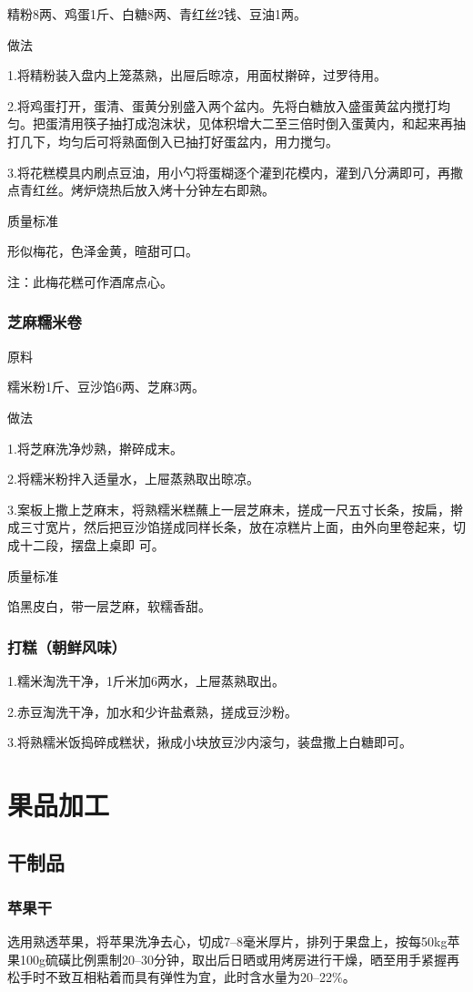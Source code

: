 \documentclass{ctexbook}
\begin{document}
精粉8两、鸡蛋1斤、白糖8两、青红丝2钱、豆油1两。

做法

1.将精粉装入盘内上笼蒸熟，出屉后晾凉，用面杖擀碎，过罗待用。

2.将鸡蛋打开，蛋清、蛋黄分别盛入两个盆内。先将白糖放入盛蛋黄盆内搅打均匀。把蛋清用筷子抽打成泡沫状，见体积增大二至三倍时倒入蛋黄内，和起来再抽打几下，均匀后可将熟面倒入已抽打好蛋盆内，用力搅匀。

3.将花糕模具内刷点豆油，用小勺将蛋糊逐个灌到花模内，灌到八分满即可，再撒点青红丝。烤炉烧热后放入烤十分钟左右即熟。

质量标准

形似梅花，色泽金黄，暄甜可口。

注：此梅花糕可作酒席点心。
\subsection{芝麻糯米卷}
原料

糯米粉1斤、豆沙馅6两、芝麻3两。

做法

1.将芝麻洗净炒熟，擀碎成末。

2.将糯米粉拌入适量水，上屉蒸熟取出晾凉。

3.案板上撒上芝麻末，将熟糯米糕蘸上一层芝麻未，搓成一尺五寸长条，按扁，擀成三寸宽片，然后把豆沙馅搓成同样长条，放在凉糕片上面，由外向里卷起来，切成十二段，摆盘上桌即
可。

质量标准

馅黑皮白，带一层芝麻，软糯香甜。
\subsection{打糕（朝鲜风味）}
1.糯米淘洗干净，1斤米加6两水，上屉蒸熟取出。

2.赤豆淘洗干净，加水和少许盐煮熟，搓成豆沙粉。

3.将熟糯米饭捣碎成糕状，揪成小块放豆沙内滚匀，装盘撒上白糖即可。
\chapter{果品加工}
\section{干制品}
\subsection{苹果干}
选用熟透苹果，将苹果洗净去心，切成7--8毫米厚片，排列于果盘上，按每50kg苹果100g硫磺比例熏制20--30分钟，取出后日晒或用烤房进行干燥，晒至用手紧握再松手时不致互相粘着而具有弹性为宜，此时含水量为20--22\%。
\end{document}
